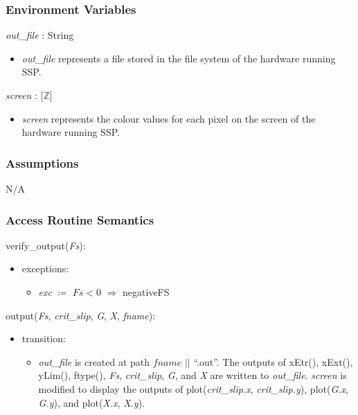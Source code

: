 \documentclass[12pt, titlepage]{article}
\newcommand{\progname}{SSP}
\begin{document}
\subsubsection{Environment Variables}

\textit{out\_file} : String
\begin{itemize}
	\item \textit{out\_file} represents a file stored in the file system of the 
	hardware running \progname{}. \\
\end{itemize}

\textit{screen} : [$\mathbb{Z}$]
\begin{itemize}
	\item \textit{screen} represents the colour values for each pixel on the 
	screen of the hardware running \progname{}. \\
\end{itemize}

\subsubsection{Assumptions}
N/A

\subsubsection{Access Routine Semantics}
verify\_output(\textit{Fs}):
\begin{itemize}
	\item exceptions:
	\begin{itemize}
		\item[] \textit{exc} $\coloneqq$ $\textit{Fs} < 0$ 
		$\Rightarrow$ negativeFS\\
	\end{itemize}
\end{itemize}

\noindent output(\textit{Fs}, \textit{crit\_slip}, \textit{G}, \textit{X}, 
\textit{fname}):
\begin{itemize}
	\item transition:
	\begin{itemize}
		\item[] \textit{out\_file} is created at path $\textit{fname}$ $||$ 
		``.out''. The outputs of xEtr(), xExt(), yLim(), ftype(), \textit{Fs}, 
		\textit{crit\_slip}, \textit{G}, and \textit{X} are written to 
		\textit{out\_file}.
		\textit{screen} is modified to display the outputs of 
		plot(\textit{crit\_slip.x}, \textit{crit\_slip.y}), plot(\textit{G.x}, 
		\textit{G.y}), and plot(\textit{X.x}, \textit{X.y}).  \\
	\end{itemize}
\end{itemize}
\end{document}
